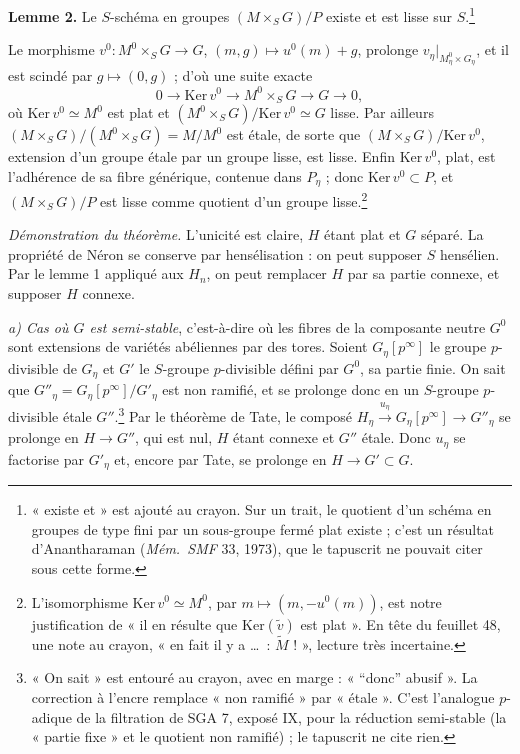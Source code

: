 \documentclass[11pt,a4paper]{article}
\begin{document}
\textbf{Lemme 2.} Le $S$-schéma en groupes $(M \times_S G)/P$ existe et est
lisse sur $S$.\footnote{« existe et » est ajouté au crayon. Sur un trait, le
quotient d'un schéma en groupes de type fini par un sous-groupe fermé plat
existe ; c'est un résultat d'Anantharaman (\emph{Mém.\ SMF} 33, 1973), que
le tapuscrit ne pouvait citer sous cette forme.}

Le morphisme $v^0 : M^0 \times_S G \to G$, $(m, g) \mapsto u^0(m) + g$,
prolonge $v_\eta|_{M^0_\eta \times G_\eta}$, et il est scindé par
$g \mapsto (0, g)$ ; d'où une suite exacte
\[
  0 \to \mathrm{Ker}\,v^0 \to M^0 \times_S G \to G \to 0,
\]
où $\mathrm{Ker}\,v^0 \simeq M^0$ est plat et
$(M^0 \times_S G)/\mathrm{Ker}\,v^0 \simeq G$ lisse. Par ailleurs
$(M \times_S G)/(M^0 \times_S G) = M/M^0$ est étale, de sorte que
$(M \times_S G)/\mathrm{Ker}\,v^0$, extension d'un groupe étale par un groupe
lisse, est lisse. Enfin $\mathrm{Ker}\,v^0$, plat, est l'adhérence de sa fibre
générique, contenue dans $P_\eta$ ; donc $\mathrm{Ker}\,v^0 \subset P$, et
$(M \times_S G)/P$ est lisse comme quotient d'un groupe
lisse.\footnote{L'isomorphisme $\mathrm{Ker}\,v^0 \simeq M^0$, par
$m \mapsto (m, -u^0(m))$, est notre justification de « il en résulte que
$\mathrm{Ker}(\widetilde v)$ est plat ». En tête du feuillet 48, une note au
crayon, « en fait il y a \ldots\ : $\widetilde M$ ! », lecture très
incertaine.}

\emph{Démonstration du théorème.} L'unicité est claire, $H$ étant plat et $G$
séparé. La propriété de Néron se conserve par hensélisation : on peut supposer
$S$ hensélien. Par le lemme 1 appliqué aux $H_n$, on peut remplacer $H$ par sa
partie connexe, et supposer $H$ connexe.

\emph{a) Cas où $G$ est semi-stable}, c'est-à-dire où les fibres de la
composante neutre $G^0$ sont extensions de variétés abéliennes par des
tores. Soient $G_\eta[p^\infty]$ le groupe $p$-divisible de $G_\eta$ et $G'$
le $S$-groupe $p$-divisible défini par $G^0$, sa partie finie. On sait que
$G''_\eta = G_\eta[p^\infty]/G'_\eta$ est non ramifié, et se prolonge donc en
un $S$-groupe $p$-divisible étale $G''$.\footnote{« On sait » est entouré au
crayon, avec en marge : « “donc” abusif ». La correction à l'encre remplace
« non ramifié » par « étale ». C'est l'analogue $p$-adique de la filtration de
SGA 7, exposé IX, pour la réduction semi-stable (la « partie fixe » et le
quotient non ramifié) ; le tapuscrit ne cite rien.} Par le théorème de Tate,
le composé $H_\eta \xrightarrow{u_\eta} G_\eta[p^\infty] \to G''_\eta$ se
prolonge en $H \to G''$, qui est nul, $H$ étant connexe et $G''$ étale. Donc
$u_\eta$ se factorise par $G'_\eta$ et, encore par Tate, se prolonge en
$H \to G' \subset G$.
\end{document}
